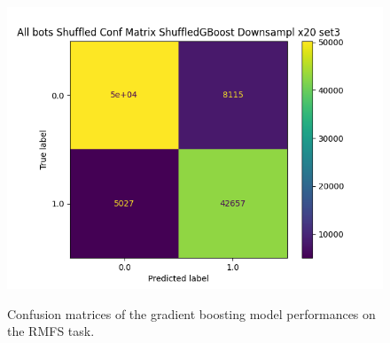 \documentclass[../../Thesis.tex]{subfiles}
\begin{document}
\begin{figure}
{							\includegraphics[scale=0.31]{../../Images/Experiments/warehouse_images/All_bots_Shuffled_Conf_Matrix_ShuffledGBoost_Downsampl_x20_set3.png}
					}
					\caption{Confusion matrices of the gradient boosting model performances on the RMFS task.}
					\label{fig:RMFS_confusion_matrices}
				\end{figure}
				
\end{document}
